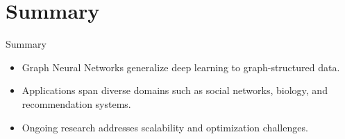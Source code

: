 \documentclass{beamer}
\begin{document}
\section{Summary}
\begin{frame}{Summary}
    \begin{itemize}
        \item Graph Neural Networks generalize deep learning to graph-structured data.
        \item Applications span diverse domains such as social networks, biology, and recommendation systems.
        \item Ongoing research addresses scalability and optimization challenges.
    \end{itemize}
\end{frame}











%     
%     



\end{document}

